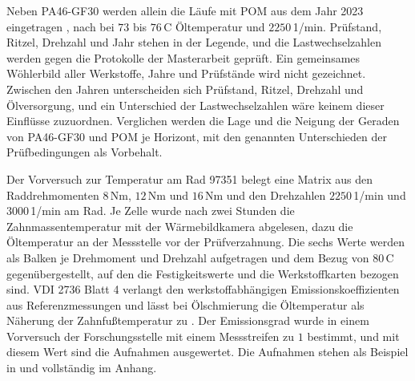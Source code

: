 Neben PA46-GF30 werden allein die Läufe mit POM aus dem Jahr 2023 eingetragen \cite[S.~43 und 65]{Fie23}, nach  bei $73$ bis $76$\,\textdegree C Öltemperatur und $2250$\,1/min. Prüfstand, Ritzel, Drehzahl und Jahr stehen in der Legende, und die Lastwechselzahlen werden gegen die Protokolle der Masterarbeit geprüft. Ein gemeinsames Wöhlerbild aller Werkstoffe, Jahre und Prüfstände wird nicht gezeichnet. Zwischen den Jahren unterscheiden sich Prüfstand, Ritzel, Drehzahl und Ölversorgung, und ein Unterschied der Lastwechselzahlen wäre keinem dieser Einflüsse zuzuordnen. Verglichen werden die Lage und die Neigung der Geraden von PA46-GF30 und POM je Horizont, mit den genannten Unterschieden der Prüfbedingungen als Vorbehalt.


Der Vorversuch zur Temperatur am Rad 97351 belegt eine Matrix aus den Raddrehmomenten $8$\,Nm, $12$\,Nm und $16$\,Nm und den Drehzahlen $2250$\,1/min und $3000$\,1/min am Rad. Je Zelle wurde nach zwei Stunden die Zahnmassentemperatur mit der Wärmebildkamera abgelesen, dazu die Öltemperatur an der Messstelle vor der Prüfverzahnung. Die sechs Werte werden als Balken je Drehmoment und Drehzahl aufgetragen und dem Bezug von $80$\,\textdegree C gegenübergestellt, auf den die Festigkeitswerte und die Werkstoffkarten bezogen sind. VDI 2736 Blatt 4 verlangt den werkstoffabhängigen Emissionskoeffizienten aus Referenzmessungen und lässt bei Ölschmierung die Öltemperatur als Näherung der Zahnfußtemperatur zu \cite[Abschnitt~8.2, S.~16 bis 17]{VDI2736-4}. Der Emissionsgrad wurde in einem Vorversuch der Forschungsstelle mit einem Messstreifen zu $1$ bestimmt, und mit diesem Wert sind die Aufnahmen ausgewertet. Die Aufnahmen stehen als Beispiel in  und vollständig im Anhang.


